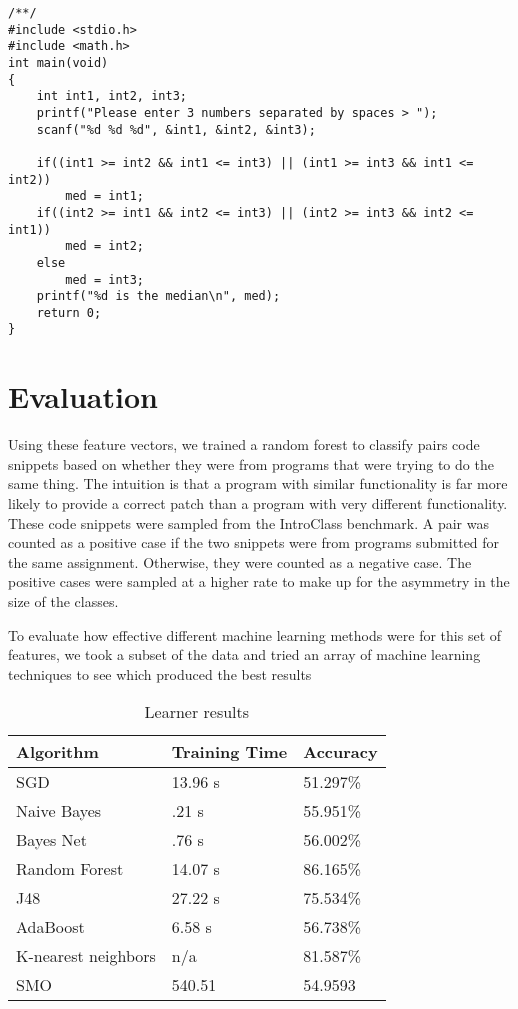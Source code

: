 \documentclass{paper}
\begin{document}
\begin{lstlisting}
/**/
#include <stdio.h>
#include <math.h>
int main(void)
{
	int int1, int2, int3; 
	printf("Please enter 3 numbers separated by spaces > ");
	scanf("%d %d %d", &int1, &int2, &int3);

	if((int1 >= int2 && int1 <= int3) || (int1 >= int3 && int1 <= int2))
		med = int1;
    if((int2 >= int1 && int2 <= int3) || (int2 >= int3 && int2 <= int1))
        med = int2;
    else
        med = int3;
    printf("%d is the median\n", med);
	return 0;
}                                             
\end{lstlisting}

\section{Evaluation}

Using these feature vectors, we trained a random forest to classify pairs code snippets based on whether they were from programs that were trying to do the same thing. 
The intuition is that a program with similar functionality is far more likely to provide a correct patch than a program with very different functionality. 
These code snippets were sampled from the IntroClass benchmark. 
A pair was counted as a positive case if the two snippets were from programs submitted for the same assignment. 
Otherwise, they were counted as a negative case. 
The positive cases were sampled at a higher rate to make up for the asymmetry in the size of the classes. 

To evaluate how effective different machine learning methods were for this set of features, we took a subset of the data and tried an array of machine learning techniques to see which produced the best results

\begin{table}[H]
\centering
\caption{Learner results}
\label{}
\begin{tabular}{lll}
\hline \hline
Algorithm & Training Time & Accuracy \\
\hline
SGD                 & 13.96 s 	& 51.297\% \\
Naive Bayes         & .21 s   	& 55.951\% \\
Bayes Net           & .76 s   	& 56.002\% \\
Random Forest       & 14.07 s 	& 86.165\% \\
J48                 & 27.22 s 	& 75.534\% \\
AdaBoost            & 6.58 s  	& 56.738\% \\
K-nearest neighbors & n/a    	& 81.587\% \\
SMO					& 540.51	& 54.9593
\end{tabular}
\end{table}
\end{document}
